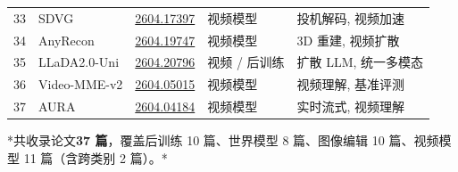 \begin{longtable}{p{0.7cm}p{2.5cm}p{2.6cm}p{2.3cm}p{5.0cm}}
33 & SDVG & \href{https://arxiv.org/abs/2604.17397}{2604.17397} & 视频模型 & 投机解码, 视频加速 \\
34 & AnyRecon & \href{https://arxiv.org/abs/2604.19747}{2604.19747} & 视频模型 & 3D 重建, 视频扩散 \\
35 & LLaDA2.0-Uni & \href{https://arxiv.org/abs/2604.20796}{2604.20796} & 视频 / 后训练 & 扩散 LLM, 统一多模态 \\
36 & Video-MME-v2 & \href{https://arxiv.org/abs/2604.05015}{2604.05015} & 视频模型 & 视频理解, 基准评测 \\
37 & AURA & \href{https://arxiv.org/abs/2604.04184}{2604.04184} & 视频模型 & 实时流式, 视频理解 \\
\bottomrule
\end{longtable}
\normalsize

*共收录论文\textbf{37 篇}，覆盖后训练 10 篇、世界模型 8 篇、图像编辑 10 篇、视频模型 11 篇（含跨类别 2 篇）。*
